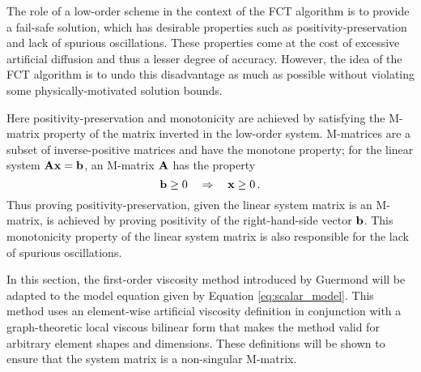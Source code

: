 
The role of a low-order scheme in the context of the FCT algorithm is to
provide a fail-safe solution, which has desirable properties such as
positivity-preservation and lack of spurious oscillations. These properties
come at the cost of excessive artificial diffusion and thus a lesser degree
of accuracy. However, the idea of the FCT algorithm is to undo this disadvantage
as much as possible without violating some physically-motivated solution bounds.

Here positivity-preservation and monotonicity are achieved by satisfying
the M-matrix property of the matrix inverted in the low-order system.
M-matrices are a subset of inverse-positive matrices and have the monotone
property; for the linear system $\mathbf{A}\mathbf{x} = \mathbf{b}$, an M-matrix $\mathbf{A}$ has the property
\begin{equation}
  \mathbf{b} \geq 0 \quad \Rightarrow \quad \mathbf{x} \geq 0 \,.
\end{equation}
Thus proving positivity-preservation, given the linear system matrix is an
M-matrix, is achieved by proving positivity of the right-hand-side vector $\mathbf{b}$.
This monotonicity property of the linear system matrix is also responsible for
the lack of spurious oscillations.

In this section, the first-order viscosity method introduced by Guermond
\cite{guermond_firstorder} will be adapted to the model equation given by
Equation \eqref{eq:scalar_model}. This method uses an element-wise artificial
viscosity definition in conjunction with a graph-theoretic local viscous
bilinear form that makes the method valid for arbitrary element shapes and
dimensions. These definitions will be shown to ensure that the system matrix
is a non-singular M-matrix.

